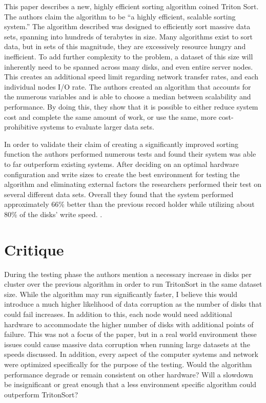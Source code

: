 \documentclass[11pt]{article}
\begin{document}
This paper describes a new, highly efficient sorting algorithm coined Triton Sort. The authors claim the algorithm to be ``a highly efficient, scalable sorting system.'' \cite{Rasmussen:2013:TBE:2427631.2427634} The algorithm described was designed to efficiently sort massive data sets, spanning into hundreds of terabytes in size. Many algorithms exist to sort data, but in sets of this magnitude, they are excessively resource hungry and inefficient. To add further complexity to the problem, a dataset of this size will inherently need to be spanned across many disks, and even entire server nodes. This creates an additional speed limit regarding network transfer rates, and each individual nodes I/O rate. The authors created an algorithm that accounts for the numerous variables and is able to choose a median between scalability and performance. By doing this, they show that it is possible to either reduce system cost and complete the same amount of work, or use the same, more cost-prohibitive systems to evaluate larger data sets.

In order to validate their claim of creating a significantly improved sorting function the authors performed numerous tests and found their system was able to far outperform existing systems. After deciding on an optimal hardware configuration and write sizes to create the best environment for testing the algorithm and eliminating external factors the researchers performed  their test on several different data sets. Overall they found that the system performed approximately 66\% better than the previous record holder while utilizing about 80\% of the disks' write speed. \cite{Rasmussen:2013:TBE:2427631.2427634}.

\vspace*{-.1in}
\section{Critique}
\label{sec:critique}
\vspace*{-.1in}

During the testing phase the authors mention a necessary increase in disks per cluster over the previous algorithm in order to run TritonSort in the same dataset size. While the algorithm may run significantly faster, I believe this would introduce a much higher likelihood of data corruption as the number of disks that could fail increases. In addition to this, each node would need additional hardware to accommodate the higher number of disks with additional points of failure. This was not a focus of the paper, but in a real world environment these issues could cause massive data corruption when running large datasets at the speeds discussed. In addition, every aspect of the computer systems and network were optimized specifically for the purpose of the testing. Would the algorithm performance degrade or remain consistent on other hardware? Will a slowdown be insignificant or great enough that a less environment specific algorithm could outperform TritonSort?
\end{document}
